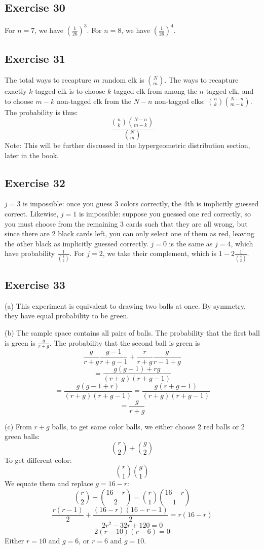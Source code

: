 \documentclass{book}
\begin{document}
\subsection*{Exercise 30}
For $n = 7$, we have $(\frac{1}{26})^3$. For $n = 8$, we have $(\frac{1}{26})^4$.

\subsection*{Exercise 31}
The total ways to recapture $m$ random elk is $\binom{N}{m}$. The ways to recapture exactly $k$ tagged elk is to choose $k$ tagged elk from among the $n$ tagged elk, and to choose $m - k$ non-tagged elk from the $N - n$ non-tagged elks: $\binom{n}{k} \binom{N - n}{m - k}$. The probability is thus:
$$\frac{\binom{n}{k} \binom{N - n}{m - k}}{\binom{N}{m}}$$
Note: This will be further discussed in the hypergeometric distribution section, later in the book.

\subsection*{Exercise 32}
$j = 3$ is impossible: once you guess 3 colors correctly, the 4th is implicitly guessed correct. Likewise, $j = 1$ is impossible: suppose you guessed one red correctly, so you must choose from the remaining 3 cards such that they are all wrong, but since there are 2 black cards left, you can only select one of them as red, leaving the other black as implicitly guessed correctly. $j = 0$ is the same as $j = 4$, which have probability $\frac{1}{\binom{4}{2}}$. For $j = 2$, we take their complement, which is $1 - 2\frac{1}{\binom{4}{2}}$.

\subsection*{Exercise 33}
(a) This experiment is equivalent to drawing two balls at once. By symmetry, they have equal probability to be green.

\noindent
(b) The sample space contains all pairs of balls. The probability that the first ball is green is $\frac{g}{r + g}$. The probability that the second ball is green is
$$\frac{g}{r + g} \frac{g - 1}{r + g - 1} + \frac{r}{r + g} \frac{g}{r - 1 + g}$$
$$= \frac{g(g - 1) + rg}{(r + g)(r + g - 1)}$$
$$= \frac{g(g - 1 + r)}{(r + g)(r + g - 1)} = \frac{g(r + g - 1)}{(r + g)(r + g - 1)}$$
$$= \frac{g}{r + g}$$

\noindent
(c) From $r + g$ balls, to get same color balls, we either choose 2 red balls or 2 green balls:
$$\binom{r}{2} + \binom{g}{2}$$
To get different color:
$$\binom{r}{1}\binom{g}{1}$$
We equate them and replace $g = 16 - r$:
$$\binom{r}{2} + \binom{16 - r}{2} = \binom{r}{1}\binom{16 - r}{1}$$
$$\frac{r(r - 1)}{2} + \frac{(16 - r)(16 - r - 1)}{2} = r (16 - r)$$
$$2r^2 - 32r + 120 = 0$$
$$2(r - 10)(r - 6) = 0$$
Either $r = 10$ and $g = 6$, or $r = 6$ and $g = 10$.
\end{document}
